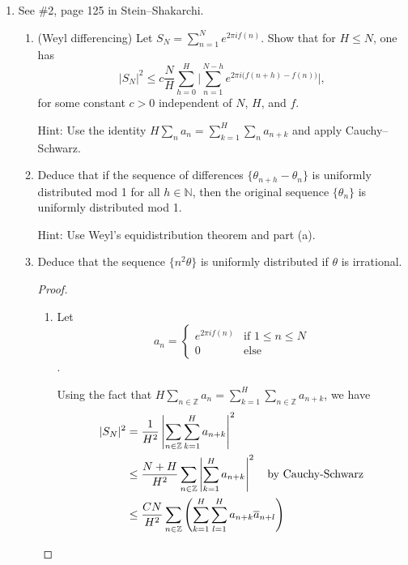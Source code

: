 \documentclass[a4paper]{article}
\newcommand{\R}{\mathbb{R}}
\newcommand{\Z}{\mathbb{Z}}
\begin{document}
\begin{enumerate}
\begin{proof}
  Therefore, $\widehat{f} \overline{ \widehat{g} } (-h) = 0$ for all $h$. Because $\widehat{f} \neq 0$ almost everywhere, $\widehat{g} = 0$ almost
  everywhere. Therefore, $g=0$ almost everywhere, and $ \{f_h\}_{h \in \R}$ spans $L^2$.

\end{proof}

\item See \#2, page 125 in Stein--Shakarchi.


\begin{enumerate}

\item (Weyl differencing) Let $S_N = \sum_{n=1}^N e^{2\pi i f(n)}$. Show that for $H\le N$, one has  $$ |S_N|^2 \le c \frac{N}{H}  \sum_{h=0}^H \bigg| \sum_{n=1}^{N-h} e^{2\pi i \big( f(n+h)  - f (n) \big)}  \bigg|,  $$ for some constant $c>0$  independent of $N$, $H$, and $f$.

Hint: Use the identity $H \sum_n a_n = \sum_{k=1}^H \sum_n a_{n+k}$ and apply Cauchy--Schwarz.

\item Deduce that if the  sequence of differences $\{ \theta_{n+h} - \theta_n \} $ is uniformly distributed mod 1 for all $h \in \mathbb N$, then the original sequence $\{ \theta_n \}$ is uniformly distributed mod 1.

Hint: Use Weyl's equidistribution theorem and part (a).

\item Deduce that the sequence $\{ n^2 \theta \}$ is uniformly distributed  if $\theta$ is irrational.

  \begin{proof}

    \begin{enumerate}
      \item
        Let
        \[ a_n =
          \begin{cases}
            e^{2 \pi i f(n)} &\text{if } 1 \leq n \leq N \\
            0 &\text{else}
          \end{cases}
        \].

        Using the fact that $H \sum_{n \in \Z} a_n = \sum_{k=1}^H \sum_{n \in \Z} a_{n+k}$, we have
        \begin{align*}
          |S_N|^2 &= \frac{1}{H^2} \left| \sum_{n \in \Z} \sum_{k=1}^H a_{n+k} \right|^2 \\
          &\leq \frac{N+H}{H^2} \sum_{n \in \Z} \left| \sum_{k=1}^H a_{n+k} \right|^2 \quad \parbox{3cm}{by Cauchy-Schwarz} \\
          &\leq \frac{C N}{H^2} \sum_{n \in \Z} \left( \sum_{k=1}^H \sum_{l=1}^H a_{n+k} \overline{a}_{n+l} \right) \\
        \end{align*}


\end{enumerate}
\end{proof}
\end{enumerate}
\end{enumerate}
\end{document}
